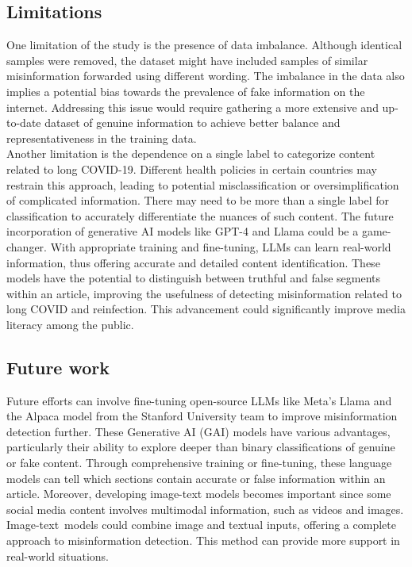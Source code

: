 \subsection{Limitations}
One limitation of the study is the presence of data imbalance. Although identical samples were removed, the dataset might have included samples of similar misinformation forwarded using different wording. The imbalance in the data also implies a potential bias towards the prevalence of fake information on the internet. Addressing this issue would require gathering a more extensive and up-to-date dataset of genuine information to achieve better balance and representativeness in the training data. \\

Another limitation is the dependence on a single label to categorize content related to long COVID-19. Different health policies in certain countries may restrain this approach, leading to potential misclassification or oversimplification of complicated information. There may need to be more than a single label for classification to accurately differentiate the nuances of such content. The future incorporation of generative AI models like GPT-4 and Llama\cite{b35} could be a game-changer. With appropriate training and fine-tuning, LLMs can learn real-world information, thus offering accurate and detailed content identification. These models have the potential to distinguish between truthful and false segments within an article, improving the usefulness of detecting misinformation related to long COVID and reinfection. This advancement could significantly improve media literacy among the public.

\subsection{Future work}
Future efforts can involve fine-tuning open-source LLMs like Meta's Llama and the Alpaca model from the Stanford University team\cite{b36} to improve misinformation detection further. These Generative AI (GAI) models have various advantages, particularly their ability to explore deeper than binary classifications of genuine or fake content. Through comprehensive training or fine-tuning, these language models can tell which sections contain accurate or false information within an article.
Moreover, developing image-text models\cite{b37} becomes important since some social media content involves multimodal information, such as videos and images. Image-text models could combine image and textual inputs, offering a complete approach to misinformation detection. This method can provide more support in real-world situations.\\

